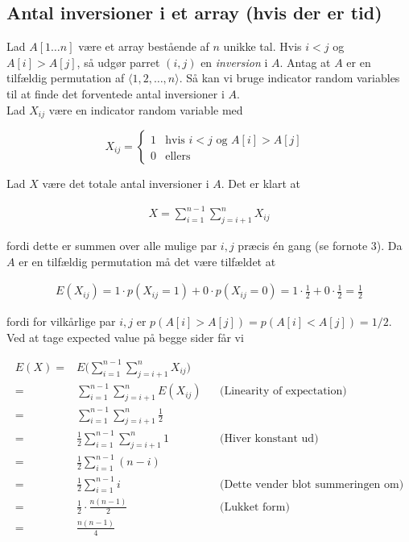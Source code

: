 \documentclass[12pt]{article}
\begin{document}
\subsection*{Antal inversioner i et array (hvis der er tid)}

Lad $A[1 \ldots n]$ være et array bestående af $n$ unikke tal. Hvis $i<j$ og $A[i] > A[j]$, så udgør parret $(i,j)$ en \textit{inversion} i $A$. Antag at $A$ er en tilfældig permutation af $\langle 1,2,\ldots,n \rangle$. Så kan vi bruge indicator random variables til at finde det forventede antal inversioner i $A$. \\

Lad $X_{ij}$ være en indicator random variable med 

\[ X_{ij} = \left\{ \begin{array}{ll}
        1 & \mbox{hvis $i<j$ og $A[i]>A[j]$  }\\
        0 & \mbox{ellers}\end{array} \right. \] 

Lad $X$ være det totale antal inversioner i $A$. Det er klart at 

\begin{align*}
    X= \sum_{i=1}^{n-1} \sum_{j=i+1}^{n} X_{ij}
\end{align*}

fordi dette er summen over alle mulige par $i,j$ præcis én gang (se fornote 3). Da $A$ er en tilfældig permutation må det være tilfældet at 

\begin{align*}
    E(X_{ij})=1 \cdot p(X_{ij}=1) + 0 \cdot p(X_{ij}=0) = 1 \cdot \frac{1}{2} +0 \cdot \frac{1}{2} = \frac{1}{2}
\end{align*}

fordi for vilkårlige par $i,j$ er $p(A[i]>A[j])=p(A[i]<A[j])=1/2$.  \\

Ved at tage expected value på begge sider får vi 

\begin{align*}
    E(X) =& E \bigg(\sum_{i=1}^{n-1} \sum_{j=i+1}^{n} X_{ij} \bigg) \\
    =& \sum_{i=1}^{n-1} \sum_{j=i+1}^{n} E(X_{ij}) && \text{(Linearity of expectation)} \\
    =& \sum_{i=1}^{n-1} \sum_{j=i+1}^{n} \frac{1}{2} \\
    =& \frac{1}{2}  \sum_{i=1}^{n-1} \sum_{j=i+1}^{n} 1 && \text{(Hiver konstant ud)} \\
    =& \frac{1}{2}  \sum_{i=1}^{n-1} (n-i) \\
    =& \frac{1}{2}  \sum_{i=1}^{n-1} i && \text{(Dette vender blot summeringen om)} \\
    =& \frac{1}{2} \cdot \frac{n(n-1)}{2} && \text{(Lukket form)} \\
    =& \frac{n(n-1)}{4}
\end{align*}
\end{document}
